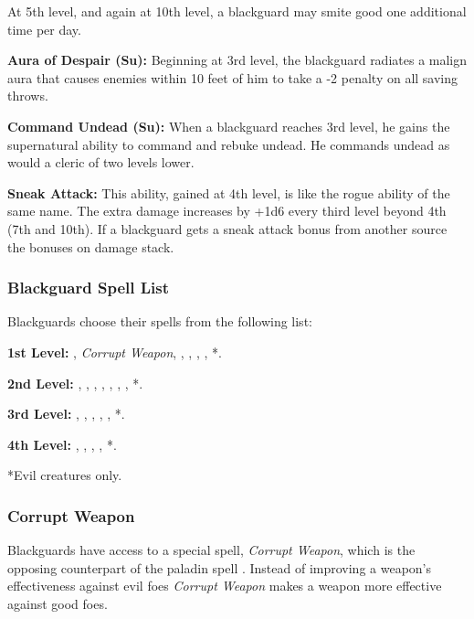 At 5th level, and again at 10th level, a blackguard may smite good one additional 
time per day.

\textbf{Aura of Despair (Su):} Beginning at 3rd level, the blackguard radiates 
a malign aura that causes enemies within 10 feet of him to take a -2 penalty on 
all saving throws.

\textbf{Command Undead (Su):} When a blackguard reaches 3rd level, he gains the 
supernatural ability to command and rebuke undead. He commands undead as would 
a cleric of two levels lower.

\textbf{Sneak Attack:} This ability, gained at 4th level, is like the rogue ability 
of the same name. The extra damage increases by +1d6 every third level beyond 4th 
(7th and 10th). If a blackguard gets a sneak attack bonus from another source the 
bonuses on damage stack.

\subsubsection{Blackguard Spell List}

Blackguards choose their spells from the following list:

\textbf{1st Level:} , \textit{Corrupt Weapon}, , , , , *.

\textbf{2nd Level:} , , , , , , , *.

\textbf{3rd Level:} , , , , , *.

\textbf{4th Level:} , , , , *.

*Evil creatures only.

\subsubsection{Corrupt Weapon}

Blackguards have access to a special spell, \textit{Corrupt Weapon}, which is the 
opposing counterpart of the paladin spell . Instead of improving 
a weapon's effectiveness against evil foes \textit{Corrupt Weapon} makes a weapon 
more effective against good foes.

